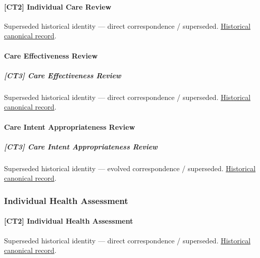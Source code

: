 \paragraph{[CT2] Individual Care Review}

\par\label{element:e1048f6c635d4e16b5384cc2cb45a71b}
Superseded historical identity — direct correspondence / superseded. \href{../../../../continuum/strategy/capability/e1048f6c635d4e16b5384cc2cb45a71b.md}{Historical canonical record}.\par

\paragraph{Care Effectiveness Review}

\subparagraph{[CT3] Care Effectiveness Review}

\par\label{element:31f49cdea9f44f188459503580c2b86e}
Superseded historical identity — direct correspondence / superseded. \href{../../../../continuum/strategy/capability/31f49cdea9f44f188459503580c2b86e.md}{Historical canonical record}.\par

\paragraph{Care Intent Appropriateness Review}

\subparagraph{[CT3] Care Intent Appropriateness Review}

\par\label{element:905eb2de1ac341ac96331e3d7f76079b}
Superseded historical identity — evolved correspondence / superseded. \href{../../../../continuum/strategy/capability/905eb2de1ac341ac96331e3d7f76079b.md}{Historical canonical record}.\par

\subsubsection{Individual Health Assessment}

\paragraph{[CT2] Individual Health Assessment}

\par\label{element:9111446aa2d045bd9acd98542b0eef1f}
Superseded historical identity — direct correspondence / superseded. \href{../../../../continuum/strategy/capability/9111446aa2d045bd9acd98542b0eef1f.md}{Historical canonical record}.\par


